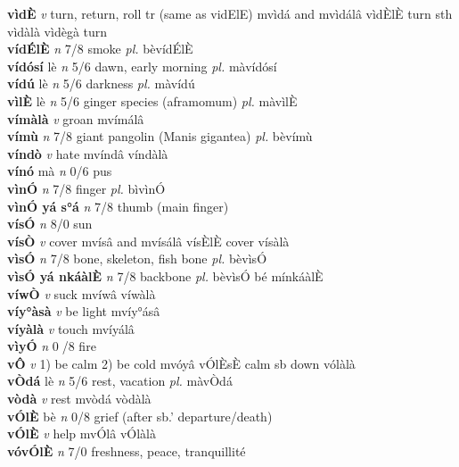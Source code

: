 \documentclass{article}
\begin{document}
{\bf vìdÈ}  {\it v} turn, return, roll tr (same as vidElE)   mvìdá and mvìdálâ vìdÈlÈ turn sth  vìdàlà vìdègà turn  \\ 
{\bf vídÉlÈ}  {\it n} 7/8 smoke {\it pl.} bèvídÉlÈ         \\ 
{\bf vídósí} lè {\it n} 5/6 dawn, early morning {\it pl.} màvídósí         \\ 
{\bf vídú} lè {\it n} 5/6 darkness {\it pl.} màvídú         \\ 
{\bf vìlÈ} lè {\it n} 5/6 ginger species (aframomum) {\it pl.} màvìlÈ         \\ 
{\bf vímàlà}  {\it v} groan   mvímálâ      \\ 
{\bf vímù}  {\it n} 7/8 giant pangolin (Manis gigantea) {\it pl.} bèvímù         \\ 
{\bf víndò}  {\it v} hate   mvíndâ   víndàlà   \\ 
{\bf vínó} mà {\it n} 0/6 pus         \\ 
{\bf vìnÓ}  {\it n} 7/8 finger {\it pl.} bìvìnÓ         \\ 
{\bf vìnÓ yá s°á}  {\it n} 7/8 thumb (main finger)         \\ 
{\bf vísÓ}  {\it n} 8/0 sun         \\ 
{\bf vísÒ}  {\it v} cover   mvísâ and mvísálâ vísÈlÈ cover  vísàlà   \\ 
{\bf vìsÓ}  {\it n} 7/8 bone, skeleton, fish bone {\it pl.} bèvìsÓ         \\ 
{\bf vìsÓ yá nkáàlÈ}  {\it n} 7/8 backbone {\it pl.} bèvìsÓ bé mínkáàlÈ         \\ 
{\bf víwÒ}  {\it v} suck   mvíwâ   víwàlà   \\ 
{\bf víy°àsà}  {\it v} be light   mvíy°ásâ      \\ 
{\bf víyàlà}  {\it v} touch   mvíyálâ      \\ 
{\bf vìyÓ}  {\it n} 0/8 fire         \\ 
{\bf vÔ}  {\it v} 1) be calm 2) be cold   mvóyâ  vÓlÈsÈ calm sb down vólàlà   \\ 
{\bf vÒdá} lè {\it n} 5/6 rest, vacation {\it pl.} màvÒdá         \\ 
{\bf vòdà}  {\it v} rest   mvòdá   vòdàlà   \\ 
{\bf vÓlÈ} bè {\it n} 0/8 grief (after sb.' departure/death)         \\ 
{\bf vÓlÈ}  {\it v} help   mvÓlâ   vÓlàlà   \\ 
{\bf vóvÓlÈ}  {\it n} 7/0 freshness, peace, tranquillité         \\ 
\end{document}
